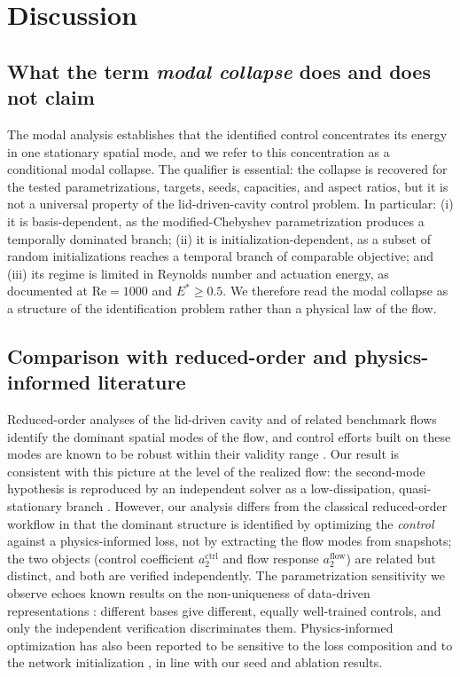 \documentclass[aip,pof,reprint,superscriptaddress]{revtex4-2}
\newcommand{\re}{\mathrm{Re}}
\begin{document}
\section{Discussion}\label{sec:discussion}

\subsection{What the term \emph{modal collapse} does and does not claim}

The modal analysis establishes that the identified control concentrates its energy in one stationary spatial mode, and we refer to this concentration as a conditional modal collapse. The qualifier is essential: the collapse is recovered for the tested parametrizations, targets, seeds, capacities, and aspect ratios, but it is not a universal property of the lid-driven-cavity control problem. In particular: (i) it is basis-dependent, as the modified-Chebyshev parametrization produces a temporally dominated branch; (ii) it is initialization-dependent, as a subset of random initializations reaches a temporal branch of comparable objective; and (iii) its regime is limited in Reynolds number and actuation energy, as documented at $\re=1000$ and $E^*\ge0.5$. We therefore read the modal collapse as a structure of the identification problem rather than a physical law of the flow.

\subsection{Comparison with reduced-order and physics-informed literature}

Reduced-order analyses of the lid-driven cavity and of related benchmark flows identify the dominant spatial modes of the flow, and control efforts built on these modes are known to be robust within their validity range \cite{rowley2004model,noack2003hierarchy,taira2017modal}. Our result is consistent with this picture at the level of the realized flow: the second-mode hypothesis is reproduced by an independent solver as a low-dissipation, quasi-stationary branch \cite{ghia1982high}. However, our analysis differs from the classical reduced-order workflow in that the dominant structure is identified by optimizing the \emph{control} against a physics-informed loss, not by extracting the flow modes from snapshots; the two objects (control coefficient $a_2^{\mathrm{ctrl}}$ and flow response $a_2^{\mathrm{flow}}$) are related but distinct, and both are verified independently. The parametrization sensitivity we observe echoes known results on the non-uniqueness of data-driven representations \cite{brunton2015closed,taira2017modal}: different bases give different, equally well-trained controls, and only the independent verification discriminates them. Physics-informed optimization has also been reported to be sensitive to the loss composition and to the network initialization \cite{raissi2019physics,karniadakis2021physics,cuomo2022}, in line with our seed and ablation results.
\end{document}
